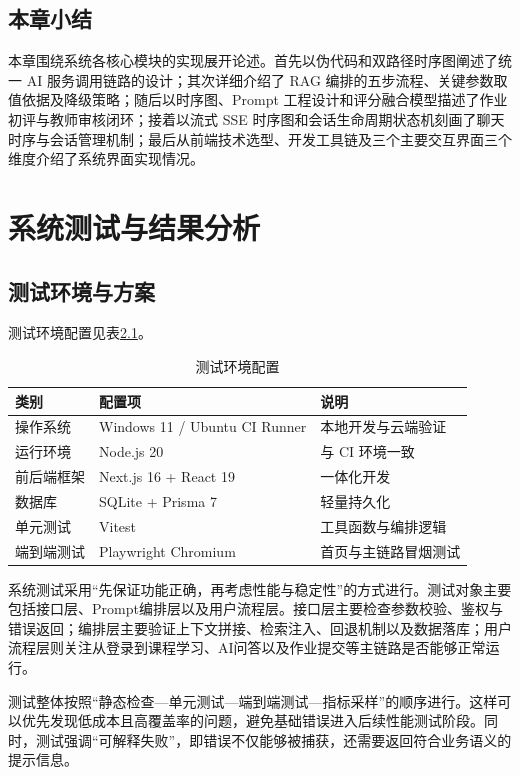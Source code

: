 \documentclass[12pt,a4paper,oneside]{ctexbook}
\numberwithin{equation}{chapter}
\begin{document}
\section{本章小结}
本章围绕系统各核心模块的实现展开论述。首先以伪代码和双路径时序图阐述了统一 AI 服务调用链路的设计；其次详细介绍了 RAG 编排的五步流程、关键参数取值依据及降级策略；随后以时序图、Prompt 工程设计和评分融合模型描述了作业初评与教师审核闭环；接着以流式 SSE 时序图和会话生命周期状态机刻画了聊天时序与会话管理机制；最后从前端技术选型、开发工具链及三个主要交互界面三个维度介绍了系统界面实现情况。

\chapter{系统测试与结果分析}

\section{测试环境与方案}

测试环境配置见表\ref{tab:testEnv}。

\begin{table}[H]
  \centering
  \caption{测试环境配置}
  \label{tab:testEnv}
  \begin{tabular}{p{2.8cm}p{6.0cm}p{4.5cm}}
    \toprule
    类别 & 配置项 & 说明 \\
    \midrule
    操作系统 & Windows 11 / Ubuntu CI Runner & 本地开发与云端验证 \\
    运行环境 & Node.js 20 & 与 CI 环境一致 \\
    前后端框架 & Next.js 16 + React 19 & 一体化开发 \\
    数据库 & SQLite + Prisma 7 & 轻量持久化 \\
    单元测试 & Vitest & 工具函数与编排逻辑 \\
    端到端测试 & Playwright Chromium & 首页与主链路冒烟测试 \\
    \bottomrule
  \end{tabular}
\end{table}

系统测试采用“先保证功能正确，再考虑性能与稳定性”的方式进行。测试对象主要包括接口层、Prompt编排层以及用户流程层。接口层主要检查参数校验、鉴权与错误返回；编排层主要验证上下文拼接、检索注入、回退机制以及数据落库；用户流程层则关注从登录到课程学习、AI问答以及作业提交等主链路是否能够正常运行。

测试整体按照“静态检查—单元测试—端到端测试—指标采样”的顺序进行。这样可以优先发现低成本且高覆盖率的问题，避免基础错误进入后续性能测试阶段。同时，测试强调“可解释失败”，即错误不仅能够被捕获，还需要返回符合业务语义的提示信息。
\end{document}
